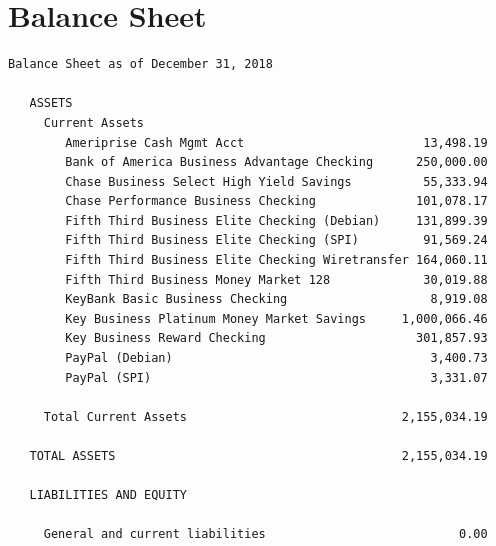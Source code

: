 \documentclass[a4paper]{report}
\begin{document}
\section{Balance Sheet}

\begin{verbatim}
Balance Sheet as of December 31, 2018

   ASSETS
     Current Assets
        Ameriprise Cash Mgmt Acct                         13,498.19
        Bank of America Business Advantage Checking      250,000.00
        Chase Business Select High Yield Savings          55,333.94
        Chase Performance Business Checking              101,078.17
        Fifth Third Business Elite Checking (Debian)     131,899.39
        Fifth Third Business Elite Checking (SPI)         91,569.24
        Fifth Third Business Elite Checking Wiretransfer 164,060.11
        Fifth Third Business Money Market 128             30,019.88
        KeyBank Basic Business Checking                    8,919.08
        Key Business Platinum Money Market Savings     1,000,066.46
        Key Business Reward Checking                     301,857.93
        PayPal (Debian)                                    3,400.73
        PayPal (SPI)                                       3,331.07

     Total Current Assets                              2,155,034.19

   TOTAL ASSETS                                        2,155,034.19

   LIABILITIES AND EQUITY

     General and current liabilities                           0.00


\end{verbatim}
\end{document}
